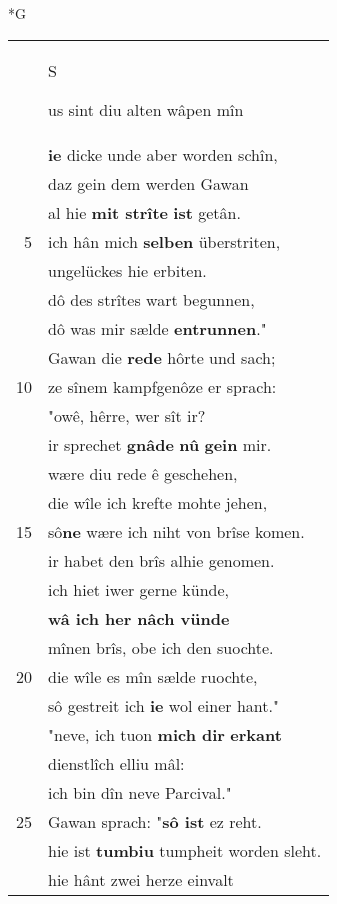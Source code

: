 \documentclass[8pt,a4paper,notitlepage]{article}
\begin{document}
\begin{table}[ht]
\begin{minipage}[t]{0.5\linewidth}
\small
\begin{center}*G
\end{center}
\begin{tabular}{rl}
 & \begin{large}S\end{large}us sint diu alten wâpen mîn\\ 
 & \textbf{ie} dicke unde aber worden schîn,\\ 
 & daz gein dem werden Gawan\\ 
 & al hie \textbf{mit strîte} \textbf{ist} getân.\\ 
5 & ich hân mich \textbf{selben} überstriten,\\ 
 & ungelückes hie erbiten.\\ 
 & dô des strîtes wart begunnen,\\ 
 & dô was mir sælde \textbf{entrunnen}."\\ 
 & Gawan die \textbf{rede} hôrte und sach;\\ 
10 & ze sînem kampfgenôze er sprach:\\ 
 & "owê, hêrre, wer sît ir?\\ 
 & ir sprechet \textbf{gnâde} \textbf{nû} \textbf{gein} mir.\\ 
 & wære diu rede ê geschehen,\\ 
 & die wîle ich krefte mohte jehen,\\ 
15 & sô\textbf{ne} wære ich niht von brîse komen.\\ 
 & ir habet den brîs alhie genomen.\\ 
 & ich hiet iwer gerne künde,\\ 
 & \textbf{wâ ich her nâch vünde}\\ 
 & mînen brîs, obe ich den suochte.\\ 
20 & die wîle es mîn sælde ruochte,\\ 
 & sô gestreit ich \textbf{ie} wol einer hant."\\ 
 & "neve, ich tuon \textbf{mich dir} \textbf{erkant}\\ 
 & dienstlîch elliu mâl:\\ 
 & ich bin dîn neve Parcival."\\ 
25 & Gawan sprach: "\textbf{sô ist} ez reht.\\ 
 & hie ist \textbf{tumbiu} tumpheit worden sleht.\\ 
 & hie hânt zwei herze einvalt\\ 

\end{tabular}
\end{minipage}
\end{table}
\end{document}
